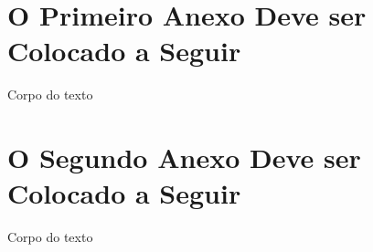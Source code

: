 \documentclass[
        oneside,      %
        english,			
        brazil			 
        ]{configcefetmglpd}
\begin{document}
\begin{anexos}

\chapter{\anexoseq O Primeiro Anexo Deve ser Colocado a Seguir} 

Corpo do texto



\chapter{\anexoseq O Segundo Anexo Deve ser Colocado a Seguir} 

Corpo do texto
  
\end{anexos}


\end{document}
